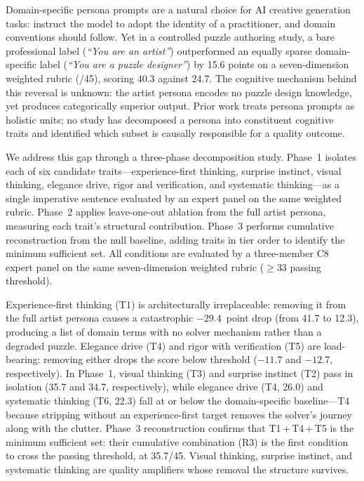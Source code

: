 Domain-specific persona prompts are a natural choice for AI creative generation tasks:
instruct the model to adopt the identity of a practitioner, and domain conventions should
follow. Yet in a controlled puzzle authoring study, a bare professional label
(\emph{``You are an artist''}) outperformed an equally sparse domain-specific label
(\emph{``You are a puzzle designer''}) by 15.6 points on a seven-dimension weighted
rubric (/45), scoring 40.3 against 24.7. The cognitive mechanism behind this reversal
is unknown: the artist persona encodes no puzzle design knowledge, yet produces
categorically superior output. Prior work treats persona prompts as holistic units;
no study has decomposed a persona into constituent cognitive traits and identified
which subset is causally responsible for a quality outcome.

We address this gap through a three-phase decomposition study. Phase~1 isolates each
of six candidate traits---experience-first thinking, surprise instinct, visual thinking,
elegance drive, rigor and verification, and systematic thinking---as a single imperative
sentence evaluated by an expert panel on the same weighted rubric. Phase~2 applies
leave-one-out ablation from the full artist persona, measuring each trait's structural
contribution. Phase~3 performs cumulative reconstruction from the null baseline, adding
traits in tier order to identify the minimum sufficient set. All conditions are evaluated
by a three-member C8 expert panel on the same seven-dimension weighted rubric ($\geq 33$
passing threshold).

Experience-first thinking (T1) is architecturally irreplaceable: removing it from the
full artist persona causes a catastrophic $-29.4$~point drop (from 41.7 to 12.3),
producing a list of domain terms with no solver mechanism rather than a degraded puzzle.
Elegance drive (T4) and rigor with verification (T5) are load-bearing: removing either
drops the score below threshold ($-11.7$ and $-12.7$, respectively). In Phase~1, visual
thinking (T3) and surprise instinct (T2) pass in isolation (35.7 and 34.7,
respectively), while elegance drive (T4, 26.0) and systematic thinking (T6, 22.3) fall
at or below the domain-specific baseline---T4 because stripping without an
experience-first target removes the solver's journey along with the clutter. Phase~3
reconstruction confirms that T1\,+\,T4\,+\,T5 is the minimum sufficient set: their
cumulative combination (R3) is the first condition to cross the passing threshold, at
35.7/45. Visual thinking, surprise instinct, and systematic thinking are quality
amplifiers whose removal the structure survives.

